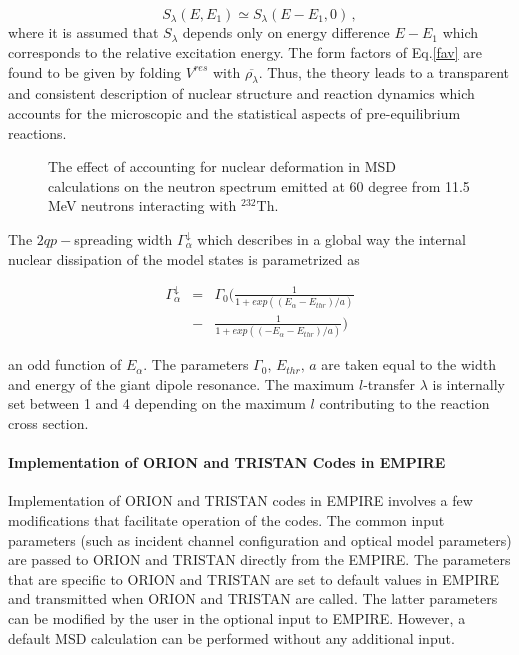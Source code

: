 \documentclass[twocolumn,amsmath,amssymb,10pt,groupedaddress,letter]{revtex4}
\begin{document}
\begin{equation}
S_{\lambda}(E,E_{1})\simeq S_{\lambda}(E-E_{1},0)\,,\label{slrpa}
\end{equation}
\noindent where it is assumed that $S_{\lambda}$ depends only on energy difference
$E-E_{1}$ which corresponds to the relative excitation energy. The
form factors of Eq.\ref{fav} are found to be given by folding $V^{res}$
with $\overline{\rho_{\lambda}}$. Thus, the theory leads to a transparent
and consistent description of nuclear structure and reaction dynamics
which accounts for the microscopic and the statistical aspects of
pre-equilibrium reactions.


\begin{figure}[htbp]
\caption{The effect of accounting for nuclear deformation in MSD calculations on the neutron spectrum emitted at 60 degree from 11.5 MeV neutrons interacting with $^{232}$Th.}
\label{fig:Th-defMSD}
\end{figure}


The $2qp-$spreading width $\Gamma_{\alpha}^{\downarrow}$ which describes
in a global way the internal nuclear dissipation of the model states
is parametrized as

\begin{eqnarray}
\Gamma_{\alpha}^{\downarrow}&=&\Gamma_{0}(\frac{1}{1+exp((E_{\alpha}-E_{thr})/a)} \nonumber \\ &-&\frac{1}{1+exp((-E_{\alpha}-E_{thr})/a)})
\end{eqnarray}

\noindent an odd function of $E_{\alpha}$. The parameters $\Gamma_{0},\, E_{thr},\, a$
are taken equal to the width and energy of the giant dipole resonance.
The maximum $l$-transfer $\lambda$ is internally set between 1 and
4 depending on the maximum $l$ contributing to the reaction cross
section.

\medskip
\paragraph{Implementation of ORION and TRISTAN Codes in EMPIRE}

Implementation of ORION and TRISTAN codes in EMPIRE
involves a few modifications that facilitate operation of the codes.
The common input parameters (such as incident channel configuration
and optical model parameters) are passed to ORION and TRISTAN directly
from the EMPIRE. The parameters that are specific to ORION and TRISTAN
are set to default values in EMPIRE and transmitted when ORION and
TRISTAN are called. The latter parameters can be modified by the user
in the optional input to EMPIRE. However, a default MSD
calculation can be performed without any additional input.
\end{document}
